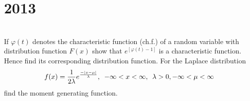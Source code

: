 \section*{2013}
\vspace{-.5cm}
\hrulefill \smallskip\\
 If $\varphi(t)$ denotes the characteristic function (ch.f.) of a random variable with distribution function $F(x)$ show that $e^{[\varphi(t) -1 ]}$ is a characteristic function. Hence find its corresponding distribution function.
\myline
{} For the Laplace distribution \[ f(x) = \frac{1}{2\lambda}e^{\frac{-\left|x - \mu \right|}{\lambda}}, \enskip -\infty<x<\infty,\enskip\lambda > 0, -\infty <\mu < \infty\] find the moment generating function.